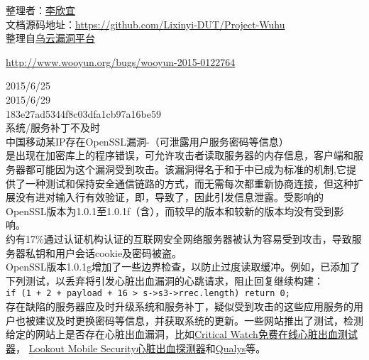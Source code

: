 \documentclass{leptc}
\begin{document}
整理者：\href{mailto:lxy_September@outlook.com}{李欣宜} \\
文档源码地址：\url{https://github.com/Lixinyi-DUT/Project-Wuhu}\\
整理自\href{http://www.wooyun.org/}{乌云漏洞平台}\\
{}
\begin{center}
\end{center} 

\begin{center}
	\url{http://www.wooyun.org/bugs/wooyun-2015-0122764}
\end{center}
 2015/6/25 \\
 2015/6/29 \\
 183e27ad5344f8c03dfa1cb97a16be59 \\
 系统/服务补丁不及时 \\
 中国移动某IP存在OpenSSL漏洞-（可泄露用户服务密码等信息）\\
是出现在加密库上的程序错误，可允许攻击者读取服务器的内存信息，客户端和服务器都可能因为这个漏洞受到攻击。该漏洞得名于和于中已成为标准的机制,它提供了一种测试和保持安全通信链路的方式，而无需每次都重新协商连接，但这种扩展没有进对输入行有效验证，即，导致了，因此引发信息泄露。受影响的OpenSSL版本为1.0.1至1.0.1f（含），而较早的版本和较新的版本均没有受到影响。\\
 约有17\%通过认证机构认证的互联网安全网络服务器被认为容易受到攻击，导致服务器私钥和用户会话cookie及密码被盗。\\
 OpenSSL版本1.0.1g增加了一些边界检查，以防止过度读取缓冲。例如，已添加了下列测试，以丢弃将引发心脏出血漏洞的心跳请求，阻止回复继续构建：\\
	\verb|if (1 + 2 + payload + 16 > s->s3->rrec.length) return 0;|\\
存在缺陷的服务器应及时升级系统和服务补丁，疑似受到攻击的这些应用服务的用户也被建议及时更换密码等信息，并获取系统的更新。一些网站推出了测试，检测给定的网站上是否存在心脏出血漏洞，比如\href{http://heartbleed.criticalwatch.com/}{Critical Watch免费在线心脏出血测试器}， \href{https://blog.lookout.com/blog/2014/04/09/heartbleed-detector/}{Lookout Mobile Security心脏出血探测器}和\href{https://www.ssllabs.com/ssltest/}{Qualys}等。\\
\end{document}
